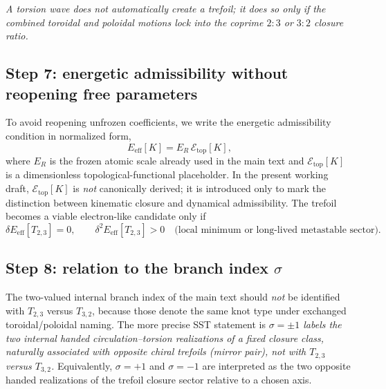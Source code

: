 \documentclass[11pt,a4paper]{article}
\begin{document}
        \medskip\noindent\textit{A torsion wave does not automatically create a trefoil; it does so only if the combined toroidal and poloidal motions lock into the coprime $2{:}3$ or $3{:}2$ closure ratio.}
    
    \subsection{Step 7: energetic admissibility without reopening free parameters}
        To avoid reopening unfrozen coefficients, we write the energetic admissibility condition in normalized form,
        \begin{equation}
            E_{\mathrm{eff}}[K]
            =
            E_R\,\mathcal E_{\mathrm{top}}[K],
            \label{eq:EeffTopNormalized}
        \end{equation}
        where \(E_R\) is the frozen atomic scale already used in the main text and \(\mathcal E_{\mathrm{top}}[K]\) is a dimensionless topological-functional placeholder. In the present working draft, \(\mathcal E_{\mathrm{top}}[K]\) is \emph{not} canonically derived; it is introduced only to mark the distinction between kinematic closure and dynamical admissibility. The trefoil becomes a viable electron-like candidate only if
        \begin{equation}
            \delta E_{\mathrm{eff}}[T_{2,3}] = 0,
            \qquad
            \delta^2 E_{\mathrm{eff}}[T_{2,3}] > 0
            \quad\text{(local minimum or long-lived metastable sector).}
            \label{eq:trefoilstabilityTrefoil}
        \end{equation}
    
    \subsection{Step 8: relation to the branch index \(\sigma\)}
        The two-valued internal branch index of the main text should \emph{not} be identified with \(T_{2,3}\) versus \(T_{3,2}\), because those denote the same knot type under exchanged toroidal/poloidal naming. The more precise SST statement is \medskip\noindent\textit{$\sigma=\pm 1$ labels the two internal handed circulation--torsion realizations of a fixed closure class, naturally associated with opposite chiral trefoils (mirror pair), not with $T_{2,3}$ versus $T_{3,2}$.}
        Equivalently, \(\sigma=+1\) and \(\sigma=-1\) are interpreted as the two opposite handed realizations of the trefoil closure sector relative to a chosen axis.
    
\end{document}
